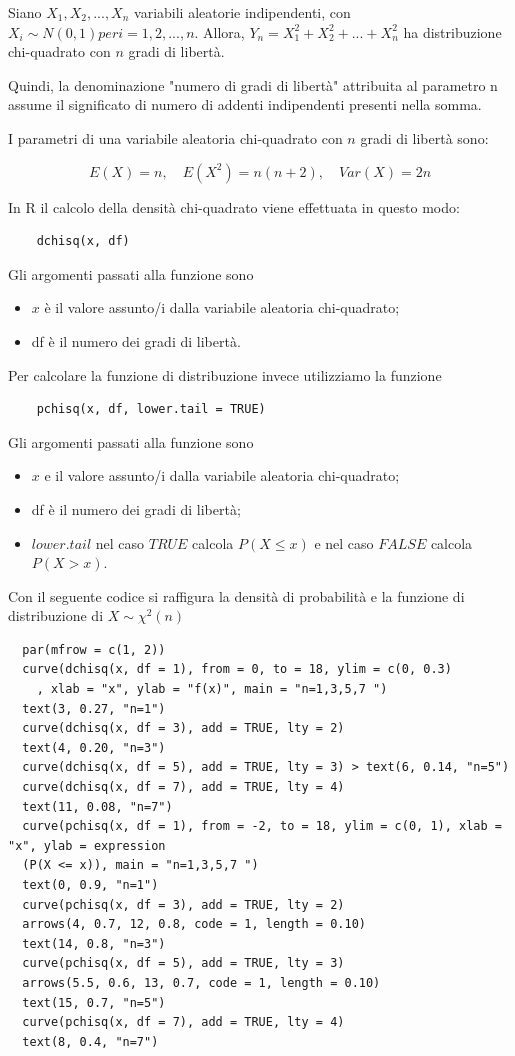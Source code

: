 Siano $X_1, X_2, ..., X_n$ variabili aleatorie indipendenti, con $X_i \sim N(0, 1) per i = 1, 2, ..., n$. Allora, $Y_n = X_1^2 + X_2^2 + ... + X_n^2$ ha distribuzione chi-quadrato con $n$ gradi di libertà.

Quindi, la denominazione "numero di gradi di libertà" attribuita al parametro n assume il significato di numero di addenti indipendenti presenti nella somma. 

I parametri di una variabile aleatoria chi-quadrato con $n$ gradi di libertà sono:

\[E(X) = n, \quad E(X^2)=n(n+2), \quad Var(X) = 2n\]

In R il calcolo della densità chi-quadrato viene effettuata in questo modo:

\begin{lstlisting}
    dchisq(x, df)
\end{lstlisting}

Gli argomenti passati alla funzione sono
\begin{itemize}
    \item $x$ è il valore assunto/i dalla variabile aleatoria chi-quadrato;
    \item df è il numero dei gradi di libertà.
\end{itemize}

Per calcolare la funzione di distribuzione invece utilizziamo la funzione

\begin{lstlisting}
    pchisq(x, df, lower.tail = TRUE)
\end{lstlisting}

Gli argomenti passati alla funzione sono
\begin{itemize}
    \item $x$ e il valore assunto/i dalla variabile aleatoria chi-quadrato;
    \item df è il numero dei gradi di libertà;
    \item $lower.tail$ nel caso $TRUE$ calcola $P(X\leq x)$ e nel caso $FALSE$ calcola $P(X>x)$.
\end{itemize}

Con il seguente codice si raffigura la densità di probabilità e la funzione di distribuzione di $X \sim \chi^2(n)$

\begin{lstlisting}
  par(mfrow = c(1, 2))
  curve(dchisq(x, df = 1), from = 0, to = 18, ylim = c(0, 0.3)
    , xlab = "x", ylab = "f(x)", main = "n=1,3,5,7 ")
  text(3, 0.27, "n=1")
  curve(dchisq(x, df = 3), add = TRUE, lty = 2)
  text(4, 0.20, "n=3")
  curve(dchisq(x, df = 5), add = TRUE, lty = 3) > text(6, 0.14, "n=5")
  curve(dchisq(x, df = 7), add = TRUE, lty = 4)
  text(11, 0.08, "n=7")
  curve(pchisq(x, df = 1), from = -2, to = 18, ylim = c(0, 1), xlab = "x", ylab = expression
  (P(X <= x)), main = "n=1,3,5,7 ")
  text(0, 0.9, "n=1")
  curve(pchisq(x, df = 3), add = TRUE, lty = 2)
  arrows(4, 0.7, 12, 0.8, code = 1, length = 0.10)
  text(14, 0.8, "n=3")
  curve(pchisq(x, df = 5), add = TRUE, lty = 3)
  arrows(5.5, 0.6, 13, 0.7, code = 1, length = 0.10)
  text(15, 0.7, "n=5")
  curve(pchisq(x, df = 7), add = TRUE, lty = 4)
  text(8, 0.4, "n=7")
\end{lstlisting}

